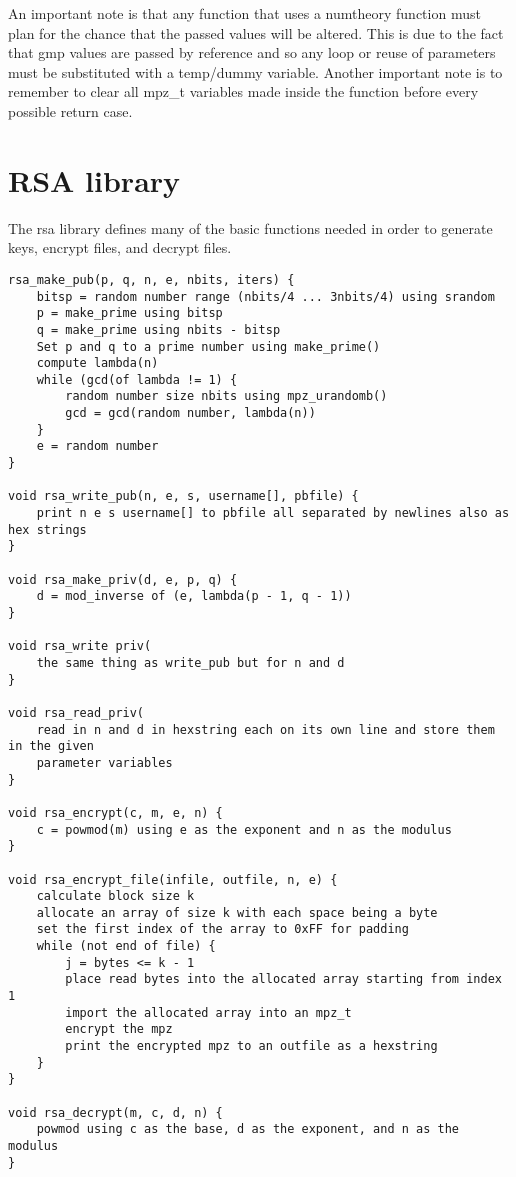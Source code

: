 \documentclass[11pt]{article}
\begin{document}
An important note is that any function that uses a numtheory function must plan for the chance that the passed values will be altered. This is due to the fact that gmp values are passed by reference and so any loop or reuse of parameters must be substituted with a temp/dummy variable.
Another important note is to remember to clear all mpz\_t variables made inside the function before every possible return case.

\section{RSA library}
The rsa library defines many of the basic functions needed in order to generate keys, encrypt files, and decrypt files. 

\begin{verbatim}
rsa_make_pub(p, q, n, e, nbits, iters) {
    bitsp = random number range (nbits/4 ... 3nbits/4) using srandom
    p = make_prime using bitsp
    q = make_prime using nbits - bitsp
    Set p and q to a prime number using make_prime()
    compute lambda(n)
    while (gcd(of lambda != 1) {
        random number size nbits using mpz_urandomb()
        gcd = gcd(random number, lambda(n))
    }
    e = random number
}

void rsa_write_pub(n, e, s, username[], pbfile) {
    print n e s username[] to pbfile all separated by newlines also as hex strings
}

void rsa_make_priv(d, e, p, q) {
    d = mod_inverse of (e, lambda(p - 1, q - 1))
}

void rsa_write priv(
    the same thing as write_pub but for n and d
}

void rsa_read_priv(
    read in n and d in hexstring each on its own line and store them in the given 
    parameter variables
}

void rsa_encrypt(c, m, e, n) {
    c = powmod(m) using e as the exponent and n as the modulus
}

void rsa_encrypt_file(infile, outfile, n, e) {
    calculate block size k
    allocate an array of size k with each space being a byte
    set the first index of the array to 0xFF for padding
    while (not end of file) {
        j = bytes <= k - 1
        place read bytes into the allocated array starting from index 1
        import the allocated array into an mpz_t
        encrypt the mpz
        print the encrypted mpz to an outfile as a hexstring
    }
}

void rsa_decrypt(m, c, d, n) {
    powmod using c as the base, d as the exponent, and n as the modulus
}


\end{verbatim}
\end{document}
